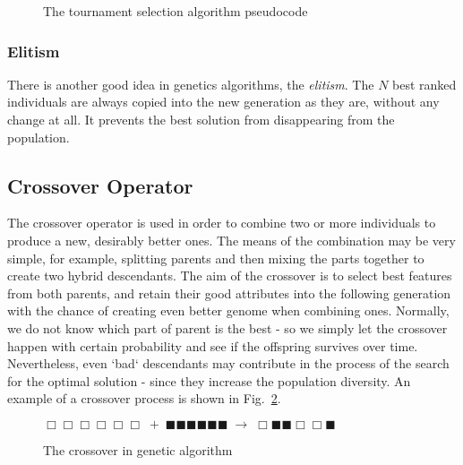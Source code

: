 \begin{figure}
\centering
\begin{algorithmic}[1]
  \ELSE
  \ENDIF
\end{algorithmic}
\caption{The tournament selection algorithm pseudocode}
\label{fig:tournament}
\end{figure}

\subsubsection{Elitism}

There is another good idea in genetics algorithms, the {\em elitism}. The $ N $ best ranked individuals are always copied into the new generation as they are, without any change at all. It prevents the best solution from disappearing from the population.

\subsection{Crossover Operator}

The crossover operator is used in order to combine two or more individuals to produce a new, desirably better ones. The means of the combination may be very simple, for example, splitting parents and then mixing the parts together to create two hybrid descendants. The aim of the crossover is to select best features from both parents, and retain their good attributes into the following generation with the chance of creating even better genome when combining ones. Normally, we do not know which part of parent is the best - so we simply let the crossover happen with certain probability and see if the offspring survives over time. Nevertheless, even `bad‘ descendants may contribute in the process of the search for the optimal solution - since they increase the population diversity. An example of a crossover process is shown in Fig.~\ref{fig:crossover}.

\begin{figure}
\begin{center}
$ \Box \Box \Box \Box \Box \Box \; + \; \blacksquare \blacksquare \blacksquare \blacksquare \blacksquare \blacksquare \; \rightarrow \; \Box \blacksquare \blacksquare \Box \Box \blacksquare $
\end{center}
\caption{The crossover in genetic algorithm}
\label{fig:crossover}
\end{figure}

